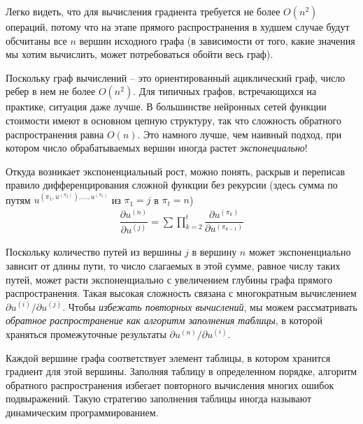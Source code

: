\documentclass[%
	11pt,
	a4paper,
	utf8,
]{article}
\begin{document}
Легко видеть, что для вычисления градиента требуется не более $ O(n^2) $ операций, потому что на этапе прямого распространения в худшем случае будут обсчитаны все $ n $ вершин исходного графа (в зависимости от того, какие значения мы хотим вычислить, может потребоваться обойти весь граф). 

{\color{blue}Поскольку граф вычислений -- это ориентированный ациклический граф, число ребер в нем не более $ O(n^2) $.}  Для типичных графов, встречающихся на практике, ситуация даже лучше. В большинстве нейронных сетей функции стоимости имеют в основном цепную структуру, так что сложность обратного распространения равна $ O(n) $. Это намного лучше, чем наивный подход, при котором число обрабатываемых вершин иногда растет \emph{экспонециально}!

Откуда возникает экспоненциальный рост, можно понять, раскрыв и переписав правило дифференцирования сложной функции без рекурсии (здесь сумма по путям $ u^{(\pi_1, u^{(\pi_2)}), \ldots, u^{(\pi_t)}} $ из $ \pi_1 = j $ в $ \pi_t = n $)
\begin{align*}
	\dfrac{ \partial u^{(n)} }{ \partial u^{(j)} } = \sum \prod_{k=2}^{t}  \dfrac{ \partial u^{(\pi_k)} }{ \partial u^{(\pi_{k - 1})} }
\end{align*}

Поскольку количество путей из вершины $ j $ в вершину $ n $ может экспоненциально зависит от длины пути, то число слагаемых в этой сумме, равное числу таких путей, может расти экспоненциально с увеличением глубины графа прямого распространения. Такая высокая сложность связана с многократным вычислением $ \partial u^{(i)} / \partial u^{(j)} $. Чтобы \emph{избежать повторных вычислений}, мы можем рассматривать \emph{обратное распространение как алгоритм заполнения таблицы}, в которой храняться промежуточные результаты $ \partial u^{(n)} / \partial u^{(i)} $.

Каждой вершине графа соответствует элемент таблицы, в котором хранится градиент для этой вершины. Заполняя таблицу в определенном порядке, алгоритм обратного распространения избегает повторного вычисления многих ошибок подвыражений. Такую стратегию заполнения таблицы иногда называют динамическим программированием.












\begin{thebibliography}{99}
	
\end{thebibliography}


\end{document}
